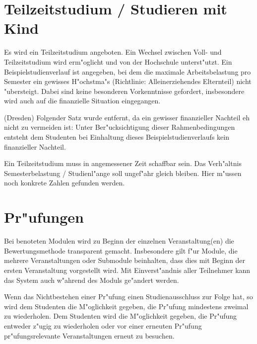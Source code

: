 \section{Teilzeitstudium / Studieren mit Kind}

Es wird ein Teilzeitstudium angeboten. Ein Wechsel zwischen Voll- und Teilzeitstudium wird erm"oglicht und von der Hochschule unterst"utzt. Ein Beispielstudienverlauf ist angegeben, bei dem die maximale Arbeitsbelastung 
pro Semester ein gewisses H"ochstma"s (Richtlinie: Alleinerziehendes Elternteil) nicht 
"ubersteigt. Dabei sind keine besonderen Vorkenntnisse gefordert, insbesondere wird auch
auf die finanzielle Situation eingegangen. 

\begin{kcmt}\begin{komacmt}
(Dresden) Folgender Satz wurde entfernt, da ein gewisser finanzieller Nachteil eh nicht zu vermeiden ist:
Unter Ber"ucksichtigung dieser Rahmenbedingungen
entsteht dem Studenten bei Einhaltung dieses Beispielstudienverlaufs kein finanzieller
Nachteil.
\end{komacmt}\end{kcmt}

\begin{kcmt}\begin{komacmt}
Ein Teilzeitstudium muss in angemessener Zeit schaffbar sein. Das Verh"altnis 
Semesterbelastung / Studienl"ange soll ungef"ahr gleich bleiben. 
Hier m"ussen noch konkrete Zahlen gefunden werden. 
\end{komacmt}\end{kcmt}

\section{Pr"ufungen}

Bei benoteten Modulen wird zu Beginn der einzelnen Veranstaltung(en) die Bewertungsmethode 
transparent gemacht. Insbesondere gilt f"ur Module, die mehrere Veranstaltungen 
oder Submodule beinhalten, dass dies mit Beginn der ersten Veranstaltung vorgestellt wird.
Mit Einverst"andnis aller Teilnehmer kann das System auch w"ahrend des Moduls ge"andert werden. 

Wenn das Nichtbestehen einer Pr"ufung einen Studienausschluss zur Folge hat, so 
wird dem Studenten die M"oglichkeit gegeben, die Pr"ufung mindestens zweimal
zu wiederholen. Dem Studenten wird die M"oglichkeit gegeben, die Pr"ufung entweder
z"ugig zu wiederholen oder vor einer erneuten Pr"ufung pr"ufungsrelevante Veranstaltungen
erneut zu besuchen.

